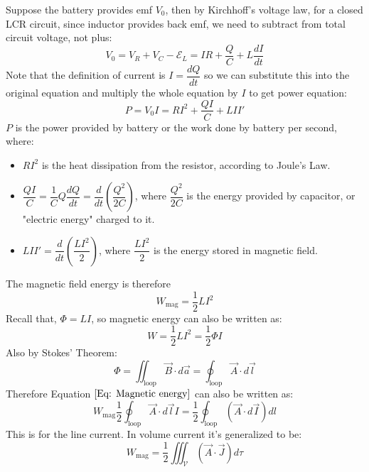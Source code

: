 \documentclass[12pt,a4paper,twoside]{article}
\numberwithin{equation}{section}
\begin{document}
Suppose the battery provides emf $V_0$, then by Kirchhoff's voltage law, for a closed LCR circuit, since inductor provides back emf, we need to subtract from total circuit voltage, not plus:
\[V_0=V_R+V_C-\mathcal{E}_L=IR+\frac{Q}{C}+L\frac{dI}{dt}\]
Note that the definition of current is $I=\dfrac{dQ}{dt}$ so we can substitute this into the original equation and multiply the whole equation by $I$ to get power equation:
\[P=V_0I=RI^2+\frac{QI}{C}+LII'\]
$P$ is the power provided by battery or the work done by battery per second, where:
\begin{itemize}
    \item $RI^2$ is the heat dissipation from the resistor, according to Joule's Law.
    \item $\dfrac{QI}{C}=\dfrac{1}{C}Q\dfrac{dQ}{dt}=\dfrac{d}{dt}(\dfrac{Q^2}{2C})$, where $\dfrac{Q^2}{2C}$ is the energy provided by capacitor, or "electric energy" charged to it.
    \item $LII'=\dfrac{d}{dt}(\dfrac{LI^2}{2})$, where $\dfrac{LI^2}{2}$ is the energy stored in magnetic field.
\end{itemize}
The magnetic field energy is therefore
\begin{equation}
    \boxed{W_{\text{mag}}=\frac{1}{2}LI^2}
    \label{Eq: Magnetic energy}
\end{equation}
Recall that, $\Phi=LI$, so magnetic energy can also be written as:
\[W=\frac{1}{2}LI^2=\frac{1}{2}\Phi I\]
Also by Stokes' Theorem:
\[\Phi=\iint_{\text{loop}}\overrightarrow{B}\cdot d\overrightarrow{a}=\oint_{\text{loop}}\overrightarrow{A}\cdot d\overrightarrow{l}\]
Therefore Equation $\ref{Eq: Magnetic energy}$ can also be written as:
\begin{equation}
    \boxed{W_{\text{mag}}\frac{1}{2}\oint_{\text{loop}}\overrightarrow{A}\cdot d\overrightarrow{l}I=\frac{1}{2}\oint_{\text{loop}}(\overrightarrow{A}\cdot d\overrightarrow{I})dl}
    \label{eq: magnetic energy ver2}
\end{equation}
This is for the line current. In volume current it's generalized to be:
\[W_{\text{mag}}=\frac{1}{2}\iiint_{\mathcal{V}}(\overrightarrow{A}\cdot \overrightarrow{J})d\tau\]
\end{document}
